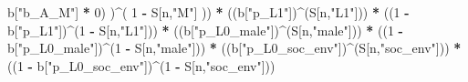 \documentclass[
]{book}
\newenvironment{Shaded}{\begin{snugshade}}{\end{snugshade}}
\newcommand{\DecValTok}[1]{\textcolor[rgb]{0.00,0.00,0.81}{#1}}
\newcommand{\NormalTok}[1]{#1}
\newcommand{\SpecialCharTok}[1]{\textcolor[rgb]{0.81,0.36,0.00}{\textbf{#1}}}
\newcommand{\StringTok}[1]{\textcolor[rgb]{0.31,0.60,0.02}{#1}}
\begin{document}
\begin{Shaded}
\begin{Highlighting}[]
\NormalTok{              b[}\StringTok{"b\_A\_M"}\NormalTok{] }\SpecialCharTok{*} \DecValTok{0}\NormalTok{) )}\SpecialCharTok{\^{}}\NormalTok{( }\DecValTok{1} \SpecialCharTok{{-}}\NormalTok{ S[n,}\StringTok{"M"}\NormalTok{] ))  }\SpecialCharTok{*}
\NormalTok{    ((b[}\StringTok{"p\_L1"}\NormalTok{])}\SpecialCharTok{\^{}}\NormalTok{(S[n,}\StringTok{"L1"}\NormalTok{])) }\SpecialCharTok{*}
\NormalTok{    ((}\DecValTok{1} \SpecialCharTok{{-}}\NormalTok{ b[}\StringTok{"p\_L1"}\NormalTok{])}\SpecialCharTok{\^{}}\NormalTok{(}\DecValTok{1} \SpecialCharTok{{-}}\NormalTok{ S[n,}\StringTok{"L1"}\NormalTok{])) }\SpecialCharTok{*}
\NormalTok{    ((b[}\StringTok{"p\_L0\_male"}\NormalTok{])}\SpecialCharTok{\^{}}\NormalTok{(S[n,}\StringTok{"male"}\NormalTok{])) }\SpecialCharTok{*} 
\NormalTok{    ((}\DecValTok{1} \SpecialCharTok{{-}}\NormalTok{ b[}\StringTok{"p\_L0\_male"}\NormalTok{])}\SpecialCharTok{\^{}}\NormalTok{(}\DecValTok{1} \SpecialCharTok{{-}}\NormalTok{ S[n,}\StringTok{"male"}\NormalTok{])) }\SpecialCharTok{*} 
\NormalTok{    ((b[}\StringTok{"p\_L0\_soc\_env"}\NormalTok{])}\SpecialCharTok{\^{}}\NormalTok{(S[n,}\StringTok{"soc\_env"}\NormalTok{])) }\SpecialCharTok{*}
\NormalTok{    ((}\DecValTok{1} \SpecialCharTok{{-}}\NormalTok{ b[}\StringTok{"p\_L0\_soc\_env"}\NormalTok{])}\SpecialCharTok{\^{}}\NormalTok{(}\DecValTok{1} \SpecialCharTok{{-}}\NormalTok{ S[n,}\StringTok{"soc\_env"}\NormalTok{])) }
    

\end{Highlighting}
\end{Shaded}
\end{document}
